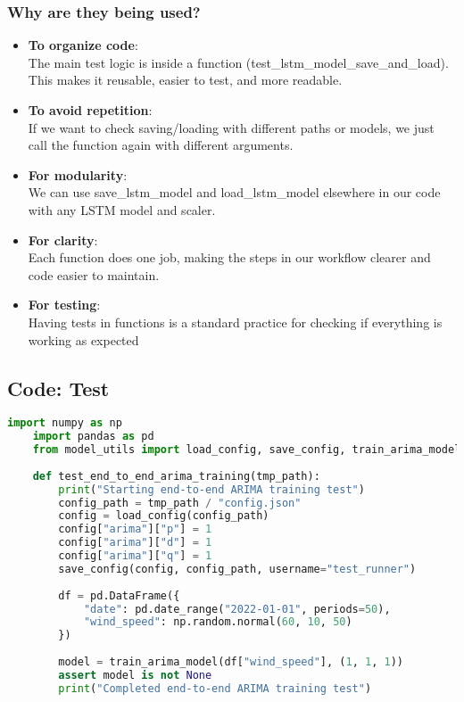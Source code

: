 \subsubsection{Why are they being used?}
\begin{itemize}
	\item \textbf{To organize code}:\\
	The main test logic is inside a function (test\_lstm\_model\_save\_and\_load).
	This makes it reusable, easier to test, and more readable.
	\item \textbf{To avoid repetition}:\\
	If we want to check saving/loading with different paths or models,
	we just call the function again with different arguments.
	\item \textbf{For modularity}:\\
	We can use save\_lstm\_model and load\_lstm\_model elsewhere in our code with any LSTM model and scaler.
	\item \textbf{For clarity}:\\
	Each function does one job, making the steps in our workflow clearer and code easier to maintain.
	\item \textbf{For testing}:\\
	Having tests in functions is a standard practice for checking if everything is working as expected
\end{itemize}

\newpage
\subsection{Code: Test}

\begin{lstlisting}[language=Python,caption={Integration testing}, label={integrationTest}]
	import numpy as np
	import pandas as pd
	from model_utils import load_config, save_config, train_arima_model  # Adjust import path if needed
	
	def test_end_to_end_arima_training(tmp_path):
		print("Starting end-to-end ARIMA training test")
		config_path = tmp_path / "config.json"
		config = load_config(config_path)
		config["arima"]["p"] = 1
		config["arima"]["d"] = 1
		config["arima"]["q"] = 1
		save_config(config, config_path, username="test_runner")
		
		df = pd.DataFrame({
			"date": pd.date_range("2022-01-01", periods=50),
			"wind_speed": np.random.normal(60, 10, 50)
		})
		
		model = train_arima_model(df["wind_speed"], (1, 1, 1))
		assert model is not None
		print("Completed end-to-end ARIMA training test")
	
	
\end{lstlisting}

